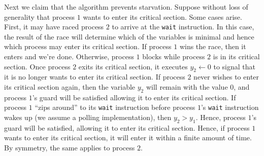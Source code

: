 \documentclass[11pt,letterpaper]{article}
\begin{document}
\begin{enumerate}
        Next we claim that the algorithm prevents starvation. Suppose without
        loss of generality that process $1$ wants to enter its critical
        section. Some cases arise. First, it may have raced process $2$ to
        arrive at the \texttt{wait} instruction. In this case, the result of
        the race will determine which of the variables is minimal and hence
        which process may enter its critical section. If process $1$ wins the
        race, then it enters and we're done. Otherwise, process $1$ blocks
        while process $2$ is in its critical section. Once process $2$ exits
        its critical section, it executes $y_2 \gets 0$ to signal that it is no
        longer wants to enter its critical section. If process $2$ never wishes
        to enter its critical section again, then the variable $y_2$ will
        remain with the value $0$, and process $1$'s guard will be satisfied
        allowing it to enter its critical section. If process $1$ ``zips
        around'' to its \texttt{wait} instruction before process $1$'s
        \texttt{wait} instruction wakes up (we assume a polling
        implementation), then $y_2 > y_1$. Hence, process $1$'s guard will be
        satisfied, allowing it to enter its critical section. Hence, if process
        $1$ wants to enter its critical section, it will enter it within a
        finite amount of time. By symmetry, the same applies to process $2$.

        \begin{figure}[ht]
            \centering


\end{figure}
\end{enumerate}
\end{document}
